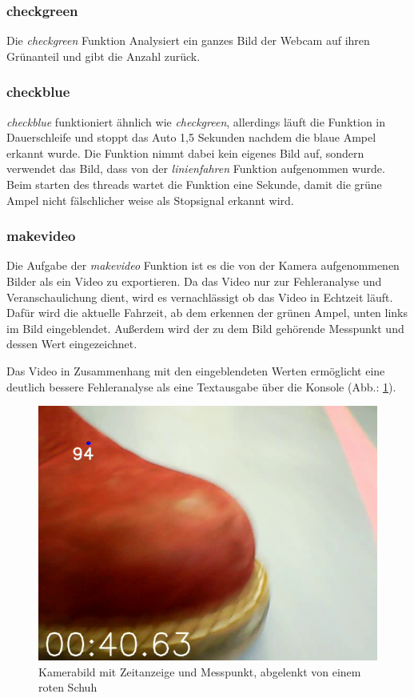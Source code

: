 \documentclass[a4paper, 12pt]{scrartcl}
\begin{document}
\subsubsection{checkgreen}	%


Die \textit{checkgreen} Funktion Analysiert ein ganzes Bild der Webcam auf ihren Grünanteil und gibt die Anzahl zurück.

\newpage
\subsubsection{checkblue}	%


\textit{checkblue} funktioniert ähnlich wie \textit{checkgreen}, allerdings läuft die Funktion in Dauerschleife und stoppt das Auto 1,5 Sekunden nachdem die blaue Ampel erkannt wurde.
Die Funktion nimmt dabei kein eigenes Bild auf, sondern verwendet das Bild, dass von der \textit{linienfahren} Funktion aufgenommen wurde. Beim starten des threads wartet die Funktion eine Sekunde, damit die grüne Ampel nicht fälschlicher weise als Stopsignal erkannt wird.

\newpage
\subsubsection{makevideo}	%


Die Aufgabe der \textit{makevideo} Funktion ist es die von der Kamera aufgenommenen Bilder als ein Video zu exportieren. Da das Video nur zur Fehleranalyse und Veranschaulichung dient, wird es vernachlässigt ob das Video in Echtzeit läuft. Dafür wird die aktuelle Fahrzeit, ab dem erkennen der grünen Ampel, unten links im Bild eingeblendet. Außerdem wird der zu dem Bild gehörende Messpunkt und dessen Wert eingezeichnet.

Das Video in Zusammenhang mit den eingeblendeten Werten ermöglicht eine deutlich bessere Fehleranalyse als eine Textausgabe über die Konsole (Abb.: \ref{schuh_im_bild}).

\begin{figure}[ht!] \centering
	\includegraphics[width=.5\textwidth]{schuh_im_bild.png}
	\caption{Kamerabild mit Zeitanzeige und Messpunkt, abgelenkt von einem roten Schuh}
	\label{schuh_im_bild}
\end{figure}
\end{document}
